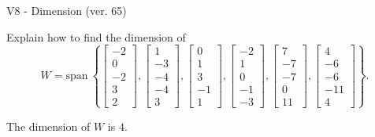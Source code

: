 \begin{exercise}
  \begin{exerciseTitle}V8 - Dimension (ver. 65)\end{exerciseTitle}
  \begin{exerciseStatement}
    Explain how to find the dimension of 
\[W=\mathrm{span}\ \left\{\left[\begin{array}{r}
-2 \\
0 \\
-2 \\
3 \\
2
\end{array}\right] , \left[\begin{array}{r}
1 \\
-3 \\
-4 \\
-4 \\
3
\end{array}\right] , \left[\begin{array}{r}
0 \\
1 \\
3 \\
-1 \\
1
\end{array}\right] , \left[\begin{array}{r}
-2 \\
1 \\
0 \\
-1 \\
-3
\end{array}\right] , \left[\begin{array}{r}
7 \\
-7 \\
-7 \\
0 \\
11
\end{array}\right] , \left[\begin{array}{r}
4 \\
-6 \\
-6 \\
-11 \\
4
\end{array}\right]\right\}.\]



  \end{exerciseStatement}
  \begin{exerciseAnswer}
   The dimension of \(W\) is  \(4\).
  


  \end{exerciseAnswer}
\end{exercise}